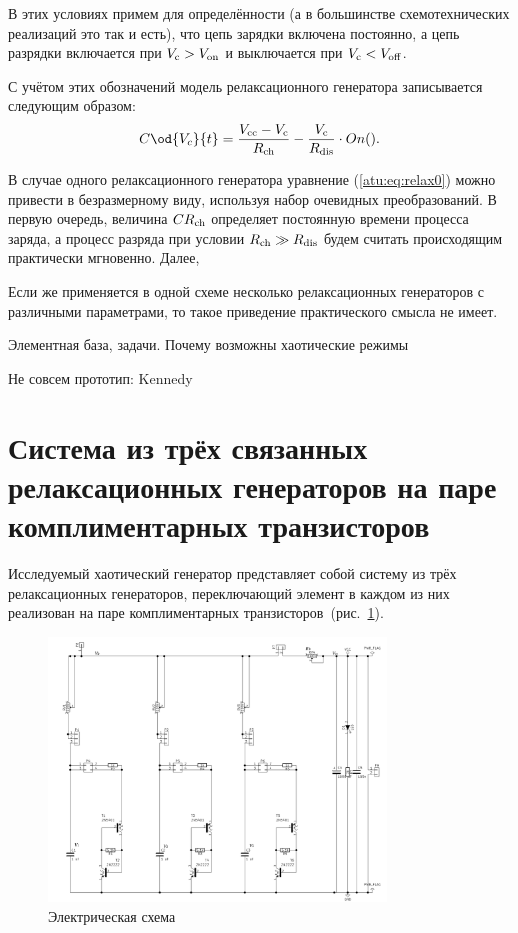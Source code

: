 
В этих условиях примем для определённости
(а в большинстве схемотехнических реализаций это так и есть),
что цепь зарядки включена постоянно, а цепь разрядки
включается при $V_\mathrm{c} > V_\mathrm{on} $ и выключается при
$V_\mathrm{c} < V_\mathrm{off}$.

С учётом этих обозначений модель релаксационного генератора
записывается следующим образом:
%
\begin{equation}
  C \od{V_c}{t}
  =
  \frac{V\Tidx{cc} - V\Tidx{c}}{R\Tidx{ch}}
  - \frac{V\Tidx{c}}{R\Tidx{dis}} \cdot On().
  \label{atu:eq:relax0}
\end{equation}

В случае одного релаксационного генератора
уравнение (\ref{atu:eq:relax0}) можно привести в безразмерному виду,
используя набор очевидных преобразований. В первую
очередь, величина $C R_\mathrm{ch}$ определяет
постоянную времени процесса заряда, а процесс
разряда при условии $R_\mathrm{ch} \gg R_\mathrm{dis} $ будем считать происходящим практически мгновенно.
Далее, 

Если же применяется в одной схеме несколько релаксационных генераторов с различными параметрами,
то такое приведение практического смысла не имеет.


Элементная база, задачи. Почему возможны хаотические режимы



Не совсем прототип: Kennedy


\cite{mishenko_du_small_relax}

\section{Система из трёх связанных релаксационных генераторов на паре комплиментарных транзисторов}
\label{atu:sec:relax3d}


Исследуемый хаотический генератор представляет собой
систему из трёх релаксационных генераторов,
переключающий элемент в каждом из них реализован
на паре комплиментарных транзисторов~(рис.~\ref{atu:f:relax3d_schem}).

\begin{figure}[htb!]
  \centerline{\includegraphics[width=0.8\textwidth]{p/relax3d_schem.png} }
  \caption{Электрическая схема \RelaxBjtIi}
  \label{atu:f:relax3d_schem}
\end{figure}

